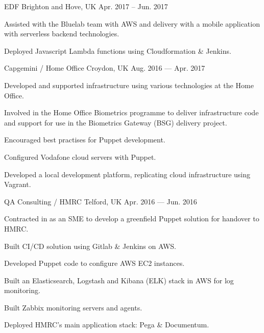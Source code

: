 \begin{cventries}
    {EDF} %
    {Brighton and Hove, UK} %
    {Apr. 2017 -- Jun. 2017} %
    {
        \begin{cvitems} %
        \item {Assisted with the Bluelab team with AWS and delivery with a mobile application with serverless backend technologies.}
        \item {Deployed Javascript Lambda functions using Cloudformation \& Jenkins.}
        \end{cvitems}
    }


    {Capgemini / Home Office} %
    {Croydon, UK} %
    {Aug. 2016 — Apr. 2017} %
    {
        \begin{cvitems} %
        \item {Developed and supported infrastructure using various technologies at the Home Office.}
        \item {Involved in the Home Office Biometrics programme to deliver infrastructure code and support for use in the Biometrics Gateway (BSG) delivery project.}
        \item {Encouraged best practises for Puppet development.}
        \item {Configured Vodafone cloud servers with Puppet.}
        \item {Developed a local development platform, replicating cloud infrastructure using Vagrant.}
        \end{cvitems}
    }


    {QA Consulting / HMRC} %
    {Telford, UK} %
    {Apr. 2016 — Jun. 2016} %
    {
        \begin{cvitems} %
        \item {Contracted in as an SME to develop a greenfield Puppet solution for handover to HMRC.}
        \item {Built CI/CD solution using Gitlab \& Jenkins on AWS.}
        \item {Developed Puppet code to configure AWS EC2 instances.}
        \item{Built an Elasticsearch, Logstash and Kibana (ELK) stack in AWS for log monitoring.}
        \item {Built Zabbix monitoring servers and agents.}
        \item {Deployed HMRC's main application stack: Pega \& Documentum.}
        \end{cvitems}
    }



\end{cventries}
